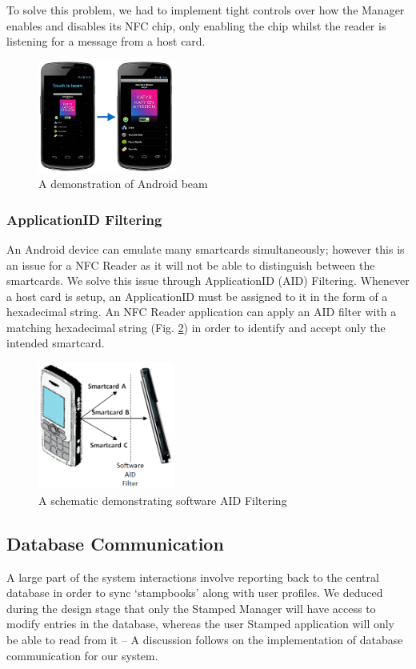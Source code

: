 To solve this problem, we had to implement tight controls over how the Manager enables and disables its NFC chip, only enabling the chip whilst the reader is listening for a message from a host card.

\begin{figure}[H]
 \centering
  \includegraphics[width=0.40\textwidth]{img/androidBeam.jpg}
     \caption{A demonstration of Android beam}
     \label{fig:androidBeam}
\end{figure}

\subsubsection{ApplicationID Filtering}
An Android device can emulate many smartcards simultaneously; however this is an issue for a NFC Reader as it will not be able to distinguish between the smartcards. We solve this issue through ApplicationID (AID) Filtering. Whenever a host card is setup, an ApplicationID must be assigned to it in the form of a hexadecimal string. An NFC Reader application can apply an AID filter with a matching hexadecimal string (Fig. \ref{fig:aidfilter}) in order to identify and accept only the intended smartcard.

\begin{figure}[H]
 \centering
  \includegraphics[width=0.40\textwidth]{img/aidfilter.png}
     \caption{A schematic demonstrating software AID Filtering}
     \label{fig:aidfilter}
\end{figure}

\subsection{Database Communication}
\label{sec:databasecommunication}
A large part of the system interactions involve reporting back to the central database in order to sync `stampbooks' along with user profiles. We deduced during the design stage that only the Stamped Manager will have access to modify entries in the database, whereas the user Stamped application will only be able to read from it -- A discussion follows on the implementation of database communication for our system.
